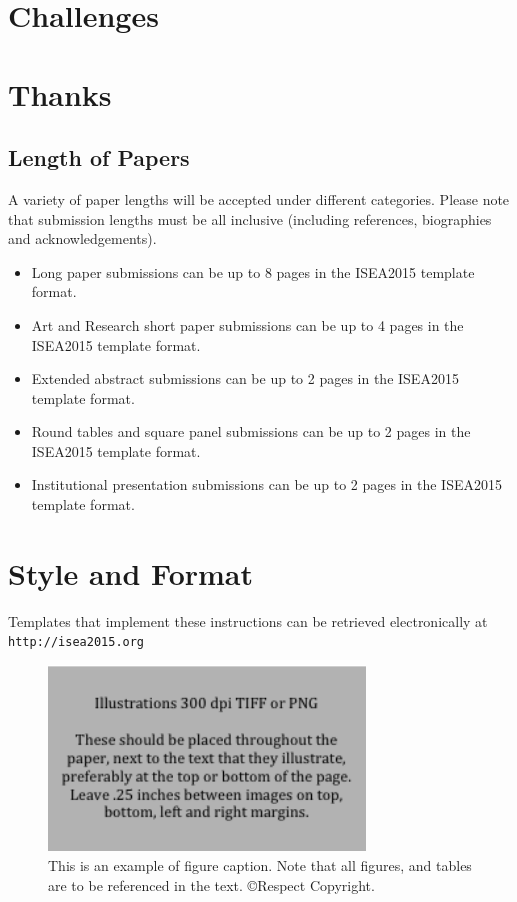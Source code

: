 \documentclass[letterpaper]{article}
\begin{document}
\section{Challenges}
\section{Thanks}

\subsection{Length of Papers}
A variety of paper lengths will be accepted under different categories. Please note that submission lengths must be all inclusive (including references, biographies and acknowledgements).
\begin{itemize}
\item Long paper submissions can be up to 8 pages in the ISEA2015 template format.
\item Art and Research short paper submissions can be up to 4 pages in the ISEA2015 template format.
\item Extended abstract submissions can be up to 2 pages in the ISEA2015 template format.
\item Round tables and square panel submissions can be up to 2 pages in the ISEA2015 template format.
\item Institutional presentation submissions can be up to 2 pages in the ISEA2015 template format.
\end{itemize}

\section{Style and Format}
Templates that implement these instructions can be retrieved electronically at {\small \tt http://isea2015.org}

\begin{figure}[h]
\includegraphics[width=3.31in]{figure.png}
\caption{This is an example of figure caption. Note that all figures, and tables are to be referenced in the text. \copyright Respect Copyright.}
\end{figure}
\end{document}
